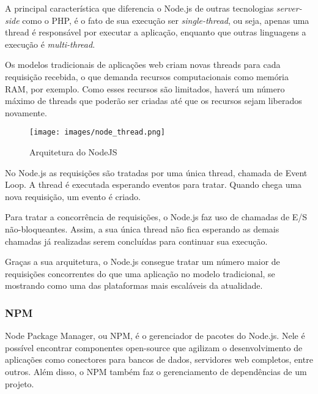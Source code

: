   
  A principal característica que diferencia o Node.js de outras tecnologias \emph{server-side} como o PHP, é o fato de sua execução ser \emph{single-thread}, ou seja, apenas uma thread é responsável por executar a aplicação, enquanto que outras linguagens a execução é \emph{multi-thread}.
  
  Os modelos tradicionais de aplicações web criam novas threads para cada requisição recebida, o que demanda recursos computacionais como memória RAM, por exemplo. Como esses recursos são limitados, haverá um número máximo de threads que poderão ser criadas até que os recursos sejam liberados novamente.
  
  \begin{figure}[h!]
  	\begin{center}
  		\texttt{[image: images/node\_thread.png]}
  		\caption{Arquitetura do NodeJS}
  		\label{fig:node}
  	\end{center}
  \end{figure}
    
  No Node.js as requisições são tratadas por uma única thread, chamada de Event Loop. A thread é executada esperando eventos para tratar. Quando chega uma nova requisição, um evento é criado.
  
  Para tratar a concorrência de requisições, o Node.js faz uso de chamadas de E/S não-bloqueantes. Assim, a sua única thread não fica esperando as demais chamadas já realizadas serem concluídas para continuar sua execução.
  
  Graças a sua arquitetura, o Node.js consegue tratar um número maior de requisições concorrentes do que uma aplicação no modelo tradicional, se mostrando como uma das plataformas mais escaláveis da atualidade.
  
  \subsubsection{NPM}
  Node Package Manager, ou NPM, é o gerenciador de pacotes do Node.js. Nele é possível encontrar componentes open-source que agilizam o desenvolvimento de aplicações como conectores para bancos de dados, servidores web completos, entre outros. Além disso, o NPM também faz o gerenciamento de dependências de um projeto.
  
